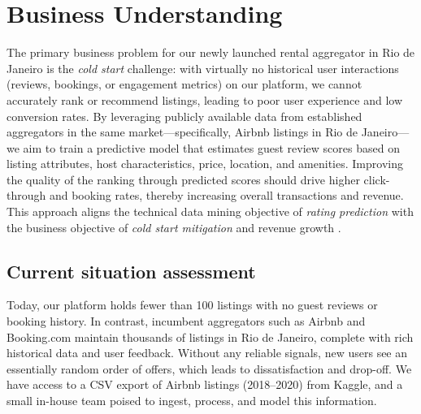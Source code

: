 \section{Business Understanding}
\label{chap:businessUnderstanding}

The primary business problem for our newly launched rental aggregator in Rio de Janeiro is the \emph{cold start} challenge: with virtually no historical user interactions (reviews, bookings, or engagement metrics) on our platform, we cannot accurately rank or recommend listings, leading to poor user experience and low conversion rates. By leveraging publicly available data from established aggregators in the same market—specifically, Airbnb listings in Rio de Janeiro—we aim to train a predictive model that estimates guest review scores based on listing attributes, host characteristics, price, location, and amenities. Improving the quality of the ranking through predicted scores should drive higher click-through and booking rates, thereby increasing overall transactions and revenue. This approach aligns the technical data mining objective of \emph{rating prediction} with the business objective of \emph{cold start mitigation} and revenue growth \cite{crispdm2000, airbnb_rio_kaggle}.  

\subsection{Current situation assessment}
\label{sec:currentSituationAssessment}

Today, our platform holds fewer than 100 listings with no guest reviews or booking history. In contrast, incumbent aggregators such as Airbnb and Booking.com maintain thousands of listings in Rio de Janeiro, complete with rich historical data and user feedback. Without any reliable signals, new users see an essentially random order of offers, which leads to dissatisfaction and drop-off. We have access to a CSV export of Airbnb listings (2018–2020) from Kaggle, and a small in-house team poised to ingest, process, and model this information.  

